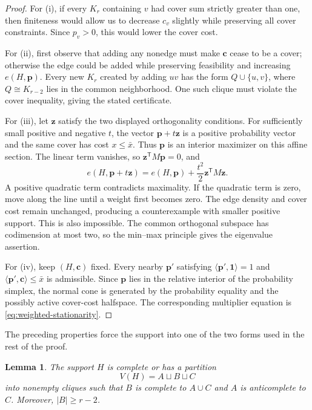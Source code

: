 \documentclass[10pt]{article}
\numberwithin{equation}{section}
\newtheorem{lemma}[lemma]{Lemma}
\newcommand{\one}{\mathbf 1}
\newcommand{\vct}[1]{\boldsymbol{#1}}
\begin{document}
\begin{proof}
For \textup{(i)}, if every $K_r$ containing $v$ had cover sum strictly greater than one, then finiteness would allow us to decrease $c_v$ slightly while preserving all cover constraints.  Since $p_v>0$, this would lower the cover cost.

For \textup{(ii)}, first observe that adding any nonedge must make $\vct c$ cease to be a cover; otherwise the edge could be added while preserving feasibility and increasing $e(H,\vct p)$.  Every new $K_r$ created by adding $uv$ has the form $Q\cup\{u,v\}$, where $Q\cong K_{r-2}$ lies in the common neighborhood.  One such clique must violate the cover inequality, giving the stated certificate.

For \textup{(iii)}, let $\vct z$ satisfy the two displayed orthogonality conditions.  For sufficiently small positive and negative $t$, the vector $\vct p+t\vct z$ is a positive probability vector and the same cover has cost $x\le\bar x$.  Thus $\vct p$ is an interior maximizer on this affine section.  The linear term vanishes, so $\vct z^{\mathsf T}M\vct p=0$, and
\[
 e(H,\vct p+t\vct z)
 =e(H,\vct p)+\frac{t^2}{2}\vct z^{\mathsf T}M\vct z.
\]
A positive quadratic term contradicts maximality.  If the quadratic term is zero, move along the line until a weight first becomes zero.  The edge density and cover cost remain unchanged, producing a counterexample with smaller positive support.  This is also impossible.  The common orthogonal subspace has codimension at most two, so the min--max principle gives the eigenvalue assertion.

For \textup{(iv)}, keep $(H,\vct c)$ fixed.  Every nearby $\vct p'$ satisfying $\langle\vct p',\one\rangle=1$ and $\langle\vct p',\vct c\rangle\le\bar x$ is admissible.  Since $\vct p$ lies in the relative interior of the probability simplex, the normal cone is generated by the probability equality and the possibly active cover-cost halfspace.  The corresponding multiplier equation is \cref{eq:weighted-stationarity}.
\end{proof}

The preceding properties force the support into one of the two forms used in the rest of the proof.

\begin{lemma}\label{lem:P3-support}
The support $H$ is complete or has a partition
\begin{equation}\label{eq:P3-partition}
 V(H)=A\sqcup B\sqcup C
\end{equation}
into nonempty cliques such that $B$ is complete to $A\cup C$ and $A$ is anticomplete to $C$.  Moreover, $|B|\ge r-2$.
\end{lemma}
\end{document}

